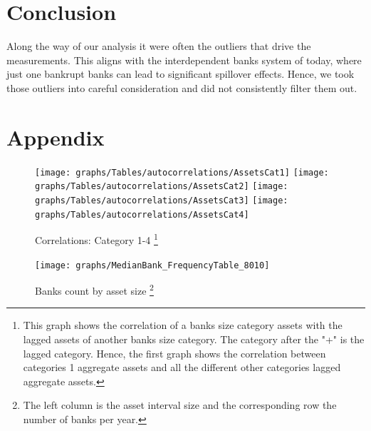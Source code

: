 \documentclass[12pt, a4paper]{article} %
\begin{document}
\section{Conclusion}

Along the way of our analysis it were often the outliers that drive the measurements. This aligns with the interdependent banks system of today, where just one bankrupt banks can lead to significant spillover effects. Hence, we took those outliers into careful consideration and did not consistently filter them out. 



\newpage
\printbibliography[
heading=bibintoc,
title={Bibliography}
]

 




\appendix
\section{Appendix}

\begin{figure}[hbtp]
\begin{minipage}{\textwidth}
\centering
\caption[1]{Correlations: Category 1-4 \footnote{This graph shows the correlation of a banks size category assets with the lagged assets of another banks size category. The category after the "+" is the lagged category. Hence, the first graph shows the correlation between categories 1 aggregate assets and all the different other categories lagged aggregate assets.}}
\texttt{[image: graphs/Tables/autocorrelations/AssetsCat1]}
\texttt{[image: graphs/Tables/autocorrelations/AssetsCat2]}
\texttt{[image: graphs/Tables/autocorrelations/AssetsCat3]}
\texttt{[image: graphs/Tables/autocorrelations/AssetsCat4]}
\label{autocorrelationsCat14}
\end{minipage}
\end{figure}




\begin{figure}[hbtp]
\begin{minipage}{\textwidth}
\centering
\caption[1]{Banks count by asset size \footnote{The left column is the asset interval size and the corresponding row the number of banks per year.}}
\texttt{[image: graphs/MedianBank\_FrequencyTable\_8010]}
\end{minipage}
\end{figure}
\end{document}
